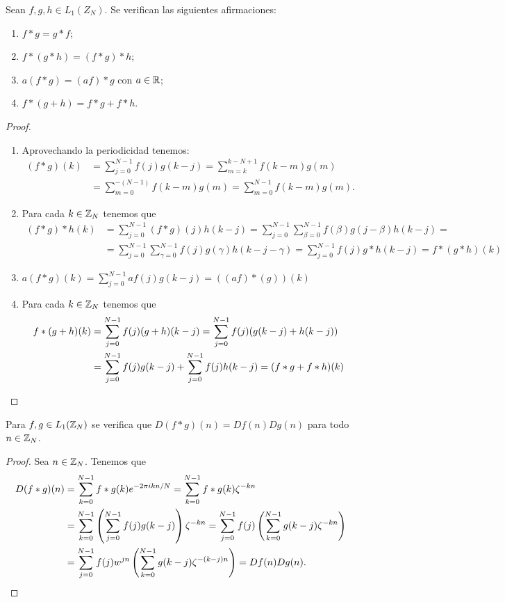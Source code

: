 \documentclass{article}
\begin{document}
\begin{proposition}
Sean $f,g,h \in L_1(Z_N)$. Se verifican las siguientes afirmaciones:
\begin{enumerate}
    \item $f\ast g=g\ast f$;
    \item $f\ast (g\ast h)=(f\ast g)\ast h$;
    \item $a(f\ast g)=(af)\ast g$ con $a \in \mathbb{R}$;
    \item $f\ast(g+h)=f\ast g+f\ast h$.
\end{enumerate}
\end{proposition}
\begin{proof}~
\begin{enumerate}
    \item Aprovechando la periodicidad tenemos:
    \begin{align*}
    (f\ast g)(k) & =\sum_{j=0}^{N-1}f(j)g(k-j)=\sum_{m=k}^{k-N+1}f(k-m)g(m) \\ &=\sum_{m=0}^{-(N-1)}f(k-m)g(m)=\sum_{m=0}^{N-1}f(k-m)g(m).
    \end{align*}
    \item Para cada $k \in \mathbb{Z}_N$ tenemos que
    \begin{align*}
    (f \ast g)\ast h (k)& =\sum_{j=0}^{N-1}(f \ast g)(j)h(k-j)=\sum_{j=0}^{N-1}\sum_{\beta=0}^{N-1}f(\beta)g(j-\beta)h(k-j)= \\
    & =\sum_{j=0}^{N-1}\sum_{\gamma=0}^{N-1}f(j)g(\gamma)h(k-j-\gamma)=\sum_{j=0}^{N-1}f(j)g \ast h(k-j)=f \ast (g \ast h)(k)
    \end{align*}
    \item $a(f\ast g)(k)=\displaystyle\sum_{j=0}^{N-1}af(j)g(k-j)=((af)\ast(g))(k)$ 
    \item Para cada $k \in \mathbb{Z}_N$ tenemos que
    \begin{align*}
    f\ast(g+h)(k) & =\displaystyle\sum_{j=0}^{N-1}f(j)(g+h)(k-j)= \sum_{j=0}^{N-1}f(j)(g(k-j)+h(k-j)) \\
     & =\displaystyle\sum_{j=0}^{N-1}f(j)g(k-j)+\sum_{j=0}^{N-1}f(j)h(k-j)=(f\ast g+f\ast h)(k) \qedhere
    \end{align*}
\end{enumerate}
\end{proof}

\begin{theorem}
  Para $f,g \in L_1(\mathbb{Z}_N)$ se verifica que $D(f \ast g)(n)=Df(n)Dg(n)$ para todo $n \in \mathbb{Z}_N$.
\end{theorem}

\begin{proof}
 Sea $n \in \mathbb{Z}_N$. Tenemos que
  \begin{align*}
    D(f\ast g)(n) &= \sum_{k=0}^{N-1}f \ast g(k)e^{-2\pi ikn/N}
    =\sum_{k=0}^{N-1} f \ast g(k)\zeta^{-kn}\\
    &=\sum_{k=0}^{N-1} \left(\sum_{j=0}^{N-1} f(j)g(k-j)\right)\zeta^{-kn}
    =\sum_{j=0}^{N-1}f(j)\left(\sum_{k=0}^{N-1}g(k-j)\zeta^{-kn}\right)\\
    &=\sum_{j=0}^{N-1} f(j)w^{jn}\left(\sum_{k=0}^{N-1}g(k-j)\zeta^{-(k-j)n}\right)
    =Df(n)Dg(n). \qedhere
    \end{align*}    
\end{proof}
\end{document}
